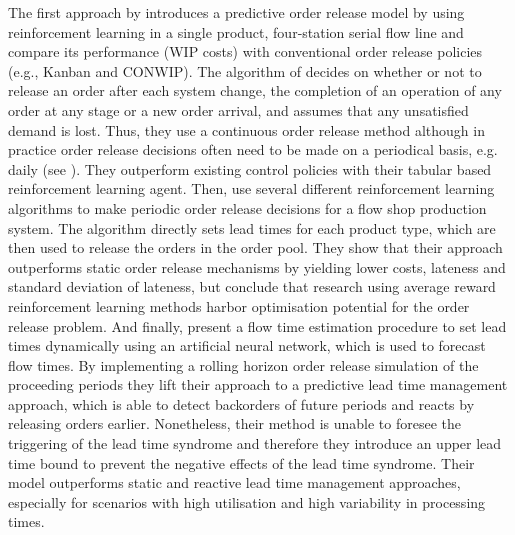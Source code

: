 \documentclass[envcountsame]{llncs}
\begin{document}
The first approach by \citet{PaterninaArboleda2001} introduces a predictive order release model by
using reinforcement learning in a single product, four-station serial flow line and compare its
performance (WIP costs) with conventional order release policies (e.g., Kanban and CONWIP).
%
%
The algorithm of \citet{PaterninaArboleda2001} decides on whether or not to release an order after
each system change, the completion of an operation of any order at any stage or a new order arrival,
and assumes that any unsatisfied demand is lost. Thus, they use a continuous order release method
although in practice order release decisions often need to be made on a periodical basis, e.g.\@
daily (see \citealt{enns2004work,GeldersvanW1982}). They outperform existing control policies with their tabular
based reinforcement learning agent.
%
Then, \citet{Schneckenreither2019} use several different reinforcement learning algorithms to make
periodic order release decisions for a flow shop production system. The algorithm directly sets lead
times for each product type, which are then used to release the orders in the order pool. They show
that their approach outperforms static order release mechanisms by yielding lower costs, lateness
and standard deviation of lateness, but conclude that research using average reward reinforcement
learning methods harbor optimisation potential for the order release problem.
%
And finally, \citet{schneckenreither2020order} present a flow time estimation procedure to set lead
times dynamically using an artificial neural network, which is used to forecast flow times. By
implementing a rolling horizon order release simulation of the proceeding periods they lift their
approach to a predictive lead time management approach, which is able to detect backorders of future
periods and reacts by releasing orders earlier. Nonetheless, their method is unable to foresee the
triggering of the lead time syndrome and therefore they introduce an upper lead time bound to
prevent the negative effects of the lead time syndrome. Their model outperforms static and reactive
lead time management approaches, especially for scenarios with high utilisation and high variability
in processing times.
\end{document}
